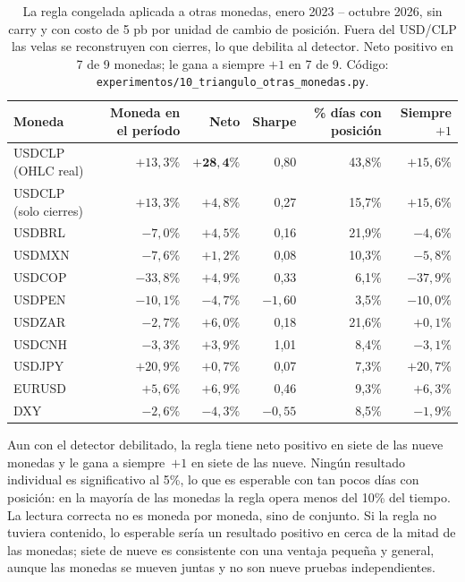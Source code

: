 \documentclass[10pt,a4paper]{article}
\newcommand{\ruta}[1]{\nolinkurl{#1}}
\begin{document}
\begin{table}[htb]\centering\small
\begin{tabular}{@{}lrrrrr@{}}
\toprule
Moneda & Moneda en el período & Neto & Sharpe & \% días con posición & Siempre $+1$ \\
\midrule
USDCLP (OHLC real)    & $+13{,}3\%$ & $\mathbf{+28{,}4\%}$ & 0,80 & 43,8\% & $+15{,}6\%$ \\
USDCLP (solo cierres) & $+13{,}3\%$ & $+4{,}8\%$  & 0,27     & 15,7\% & $+15{,}6\%$ \\
\midrule
USDBRL & $-7{,}0\%$  & $+4{,}5\%$ & 0,16     & 21,9\% & $-4{,}6\%$ \\
USDMXN & $-7{,}6\%$  & $+1{,}2\%$ & 0,08     & 10,3\% & $-5{,}8\%$ \\
USDCOP & $-33{,}8\%$ & $+4{,}9\%$ & 0,33     & 6,1\%  & $-37{,}9\%$ \\
USDPEN & $-10{,}1\%$ & $-4{,}7\%$ & $-1{,}60$ & 3,5\% & $-10{,}0\%$ \\
USDZAR & $-2{,}7\%$  & $+6{,}0\%$ & 0,18     & 21,6\% & $+0{,}1\%$ \\
USDCNH & $-3{,}3\%$  & $+3{,}9\%$ & 1,01     & 8,4\%  & $-3{,}1\%$ \\
USDJPY & $+20{,}9\%$ & $+0{,}7\%$ & 0,07     & 7,3\%  & $+20{,}7\%$ \\
EURUSD & $+5{,}6\%$  & $+6{,}9\%$ & 0,46     & 9,3\%  & $+6{,}3\%$ \\
DXY    & $-2{,}6\%$  & $-4{,}3\%$ & $-0{,}55$ & 8,5\% & $-1{,}9\%$ \\
\bottomrule
\end{tabular}
\caption{La regla congelada aplicada a otras monedas, enero 2023 -- octubre 2026, sin
carry y con costo de 5 pb por unidad de cambio de posición. Fuera del USD/CLP las velas
se reconstruyen con cierres, lo que debilita al detector. Neto positivo en 7 de 9
monedas; le gana a siempre $+1$ en 7 de 9. Código:
\ruta{experimentos/10_triangulo_otras_monedas.py}.}\label{tab:monedas}
\end{table}

Aun con el detector debilitado, la regla tiene neto positivo en siete de las nueve
monedas y le gana a siempre~$+1$ en siete de las nueve. Ningún resultado individual es
significativo al 5\%, lo que es esperable con tan pocos días con posición: en la mayoría
de las monedas la regla opera menos del 10\% del tiempo. La lectura correcta no es
moneda por moneda, sino de conjunto. Si la regla no tuviera contenido, lo esperable sería
un resultado positivo en cerca de la mitad de las monedas; siete de nueve es consistente
con una ventaja pequeña y general, aunque las monedas se mueven juntas y no son nueve
pruebas independientes.
\end{document}

